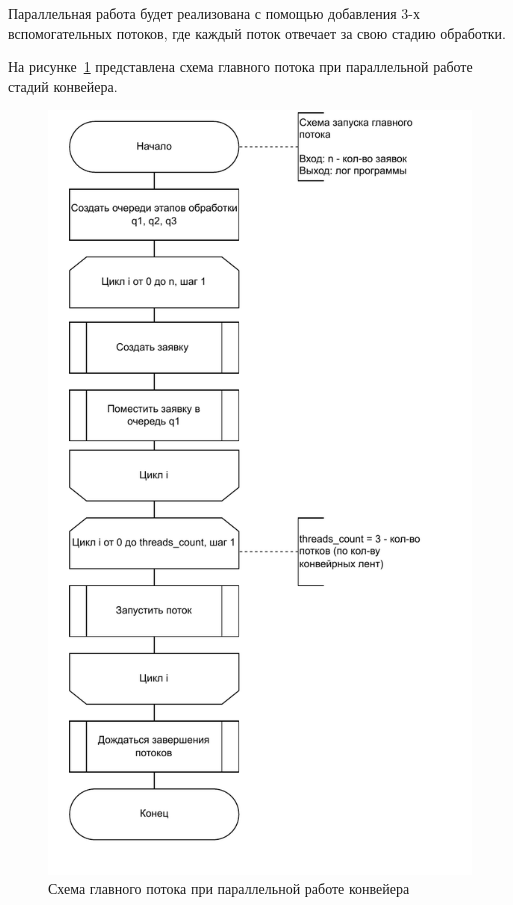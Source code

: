 Параллельная работа будет реализована с помощью добавления 3-х
вспомогательных потоков, где каждый поток отвечает за свою стадию обработки.

На рисунке~\ref{paral} представлена схема главного потока при параллельной
работе стадий конвейера.

\begin{figure}[h]
	\centering
	\includegraphics[scale=0.8]{photos/main_thread}
	\caption{Схема главного потока при параллельной работе конвейера}
	\label{paral}
\end{figure}
\clearpage

